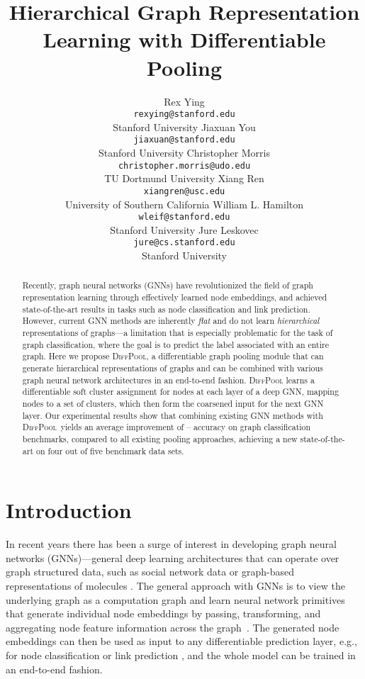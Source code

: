 \documentclass{article}
\title{Hierarchical Graph Representation Learning with Differentiable Pooling}
\author{
Rex Ying\\
\texttt{rexying@stanford.edu} \\
Stanford University
\And 
Jiaxuan You\\
\texttt{jiaxuan@stanford.edu} \\
Stanford University
\And 
Christopher Morris \\
\texttt{christopher.morris@udo.edu} \\
TU Dortmund University
\And 
Xiang Ren\\
\texttt{xiangren@usc.edu} \\
University of Southern California
\And 
William L. Hamilton\\
\texttt{wleif@stanford.edu} \\
Stanford University
\And
Jure Leskovec\\
\texttt{jure@cs.stanford.edu} \\
Stanford University
}
\newcommand{\name}{\textsc{DiffPool}\xspace}
\begin{document}
\maketitle


\begin{abstract}
Recently, graph neural networks (GNNs) have revolutionized the field of graph representation learning through effectively learned node embeddings, and achieved state-of-the-art results in tasks such as node classification and link prediction. However, current GNN methods are inherently {\em flat} and do not learn {\em hierarchical} representations of graphs---a limitation that is especially problematic for the task of graph classification, where the goal is to predict the label associated with an entire graph.
Here we propose \name, a differentiable graph pooling module that can generate hierarchical representations of graphs and can be combined with various graph neural network architectures in an end-to-end fashion. 
\name learns a differentiable soft cluster assignment for nodes at each layer of a deep GNN, mapping nodes to a set of clusters, which then form the coarsened input for the next GNN layer.
Our experimental results show that combining existing GNN methods with \name\ yields an average improvement of -- accuracy on graph classification benchmarks, compared to all existing pooling approaches, achieving a new state-of-the-art on four out of five benchmark data sets.   
\end{abstract}
%
 \section{Introduction}
\label{sec:intro}
In recent years there has been a surge of interest in developing graph neural networks (GNNs)---general deep learning architectures that can operate over graph structured data, such as social network data \cite{hamilton2017inductive,kipf2017semi,Vel+2018} or graph-based representations of molecules \cite{dai2016discriminative,Duv+2015,Gil+2017}.
The general approach with GNNs is to view the underlying graph as a computation graph and learn neural network primitives that generate individual node embeddings by passing, transforming, and aggregating node feature information across the graph~\cite{Gil+2017,hamilton2017inductive}.
The generated node embeddings can then be used as input to any differentiable prediction layer, e.g., for node classification \cite{hamilton2017inductive} or link prediction \cite{Sch+2017}, and the whole model can be trained in an end-to-end fashion. 
\end{document}
